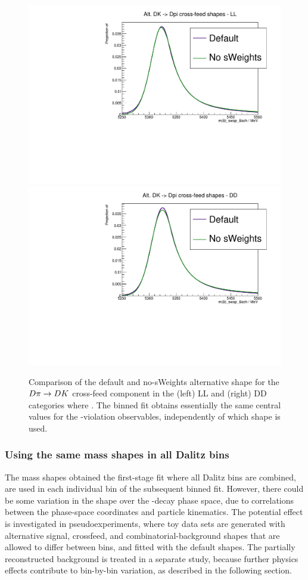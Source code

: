 \begin{figure}[tp]
    \centering
    \includegraphics[width=0.45\columnwidth]{figures/analysis/systematics/alt_noSW_misID_LL.pdf}
    \includegraphics[width=0.45\columnwidth]{figures/analysis/systematics/alt_noSW_misID_DD.pdf}
    \caption{Comparison of the default and no-sWeights alternative shape for the ${D}\pi\rightarrow{\ensuremath{D}}{\ensuremath{K}}$ cross-feed component in the (left) LL and (right) DD categories where \DtoKspipi. The binned fit obtains essentially the same central values for the \CP-violation observables, independently of which shape is used. }
    \label{fig:compare_alt_noSW_misID_shapes}
\end{figure}



\subsubsection{Using the same mass shapes in all Dalitz bins} %
\label{ssub:using_the_same_signal_shape_in_all_dalitz_bins}

The mass shapes obtained the first-stage fit where all Dalitz bins are combined, are used in each individual bin of the subsequent binned fit. However, there could be some variation in the shape over the \D-decay phase space, due to correlations between the phase-space coordinates and particle kinematics. The potential effect is investigated in pseudoexperiments, where toy data sets are generated with alternative signal, crossfeed, and combinatorial-background shapes that are allowed to differ between bins, and fitted with the default shapes. The partially reconstructed background is treated in a separate study, because further physics effects contribute to bin-by-bin variation, as described in the following section. 

